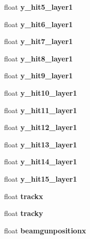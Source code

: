 \begin{DoxyCompactItemize}
\item 
float {\bfseries y\-\_\-hit5\-\_\-layer1}\label{classCALICE_1_1TrackVariables_a0268e2a52fa3db2062f8bf667e8ca8e9}

\item 
float {\bfseries y\-\_\-hit6\-\_\-layer1}\label{classCALICE_1_1TrackVariables_a0280cfa33723bcc561d76fed1cae13d2}

\item 
float {\bfseries y\-\_\-hit7\-\_\-layer1}\label{classCALICE_1_1TrackVariables_a262438e822ae2b1d8a44cdfeade7e1e9}

\item 
float {\bfseries y\-\_\-hit8\-\_\-layer1}\label{classCALICE_1_1TrackVariables_a2df4ebfdd4b24afccfeedefdeb89c6b8}

\item 
float {\bfseries y\-\_\-hit9\-\_\-layer1}\label{classCALICE_1_1TrackVariables_a392310a555ae4b43060ae4fd8880ed83}

\item 
float {\bfseries y\-\_\-hit10\-\_\-layer1}\label{classCALICE_1_1TrackVariables_a7f1becf5eae05c14aeadcba4677c2fe3}

\item 
float {\bfseries y\-\_\-hit11\-\_\-layer1}\label{classCALICE_1_1TrackVariables_a29065e54f31d39cd6fab97c3e23b213c}

\item 
float {\bfseries y\-\_\-hit12\-\_\-layer1}\label{classCALICE_1_1TrackVariables_ab08b4d5f195c304857fd67cfd64ff0e7}

\item 
float {\bfseries y\-\_\-hit13\-\_\-layer1}\label{classCALICE_1_1TrackVariables_a2dcb08f9bbcc3cfa205817ed5095f278}

\item 
float {\bfseries y\-\_\-hit14\-\_\-layer1}\label{classCALICE_1_1TrackVariables_a5ef355691c80f290d90efb5c3a0fb03d}

\item 
float {\bfseries y\-\_\-hit15\-\_\-layer1}\label{classCALICE_1_1TrackVariables_a836ecf23405c59324c3ddecafb31d5af}

\item 
float {\bfseries trackx}\label{classCALICE_1_1TrackVariables_a4ff873456f548b31531bde8dedb49e9a}

\item 
float {\bfseries tracky}\label{classCALICE_1_1TrackVariables_a666437d638c1305c9e750d220b72347b}

\item 
float {\bfseries beamgunpositionx}\label{classCALICE_1_1TrackVariables_ace77703a6f8b2f725fbfd338d5521fb4}


\end{DoxyCompactItemize}
